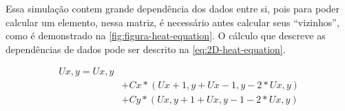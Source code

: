 Essa simulação contem grande dependência dos dados entre si, pois para poder calcular um elemento, nessa matriz, é necessário antes calcular seus “vizinhos”, como é demonstrado na \autoref{fig:figura-heat-equation}.
O cálculo que descreve as dependências de dados pode ser descrito na \autoref{eq:2D-heat-equation}.

\begin{align}
    Ux,y = Ux,y  \nonumber \\
               & + Cx * (Ux+1,y + Ux-1,y - 2 * Ux,y) \nonumber \\
               & + Cy * (Ux,y+1 + Ux,y-1 - 2 * Ux,y)
    \label{eq:2D-heat-equation}
\end{align}
